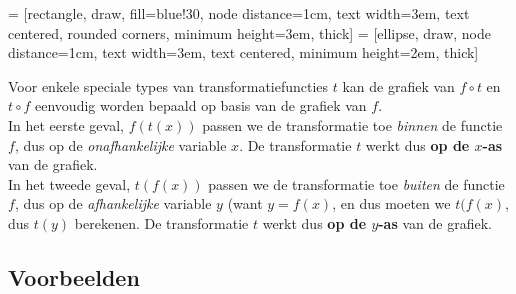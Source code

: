 \documentclass{ximera}
\begin{document}
\begin{center}
 = [rectangle, draw, fill=blue!30, node distance=1cm, text width=3em, text centered, rounded corners, minimum height=3em, thick]
 = [ellipse, draw, node distance=1cm, text width=3em, text centered, minimum height=2em, thick]
    
\end{center}

Voor enkele speciale types van transformatiefuncties $t$ kan de grafiek van $f\circ t$ en $t\circ f$ eenvoudig worden bepaald op basis van de grafiek van $f$.
\\

In het eerste geval, $f(t(x))$ passen we de transformatie toe \textit{binnen} de functie $f$, dus op de \textit{onafhankelijke} variable $x$. De transformatie  $t$ werkt dus \textbf{op de $x$-as} van de grafiek.
\\

In het tweede geval, $t(f(x))$ passen we de transformatie toe \textit{buiten} de functie $f$, dus op de \textit{afhankelijke} variable $y$ (want $y=f(x)$, en dus moeten we  $t(f(x)$, dus $t(y)$ berekenen. De transformatie $t$ werkt dus \textbf{op de $y$-as} van de grafiek.

\subsection{Voorbeelden}
\end{document}
